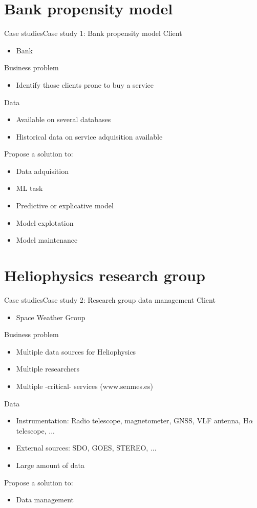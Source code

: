 \documentclass[10pt,compress]{beamer} %
\begin{document}
\section{Bank propensity model}
\begin{frame}{Case studies}{Case study 1: Bank propensity model}
	Client
	\begin{itemize}
		\item Bank
	\end{itemize}
	Business problem
	\begin{itemize}
		\item Identify those clients prone to buy a service
	\end{itemize}
	Data
	\begin{itemize}
		\item Available on several databases
		\item Historical data on service adquisition available
	\end{itemize}
	Propose a solution to:
	\begin{itemize}
		\item Data adquisition
		\item ML task
		\item Predictive or explicative model
		\item Model explotation
		\item Model maintenance
	\end{itemize}
\end{frame}

\section{Heliophysics research group}
\begin{frame}{Case studies}{Case study 2: Research group data management}
	Client
	\begin{itemize}
		\item Space Weather Group 
	\end{itemize}
	Business problem
	\begin{itemize}
		\item Multiple data sources for Heliophysics
        \item Multiple researchers
        \item Multiple -critical- services (www.senmes.es)
	\end{itemize}
	Data
	\begin{itemize}
		\item Instrumentation: Radio telescope, magnetometer, GNSS, VLF antenna, H$\alpha$ telescope, ...
        \item External sources: SDO, GOES, STEREO, ...
        \item Large amount of data
	\end{itemize}
	Propose a solution to:
	\begin{itemize}
		\item Data management
	\end{itemize}
\end{frame}
\end{document}
